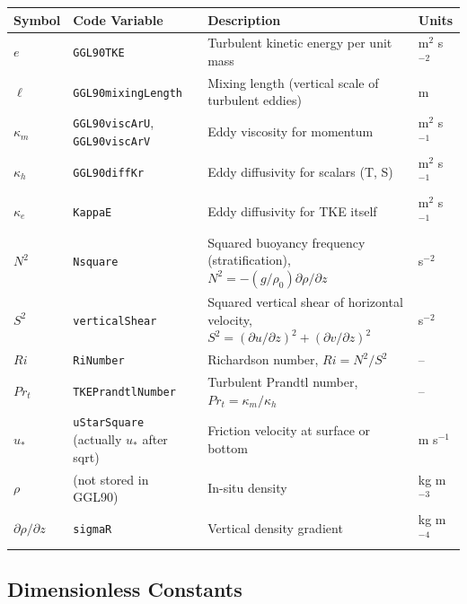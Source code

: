 \documentclass[12pt,letterpaper]{article}
\begin{document}
\begin{longtable}{p{2.5cm}p{4cm}p{6cm}l}
\toprule
\textbf{Symbol} & \textbf{Code Variable} & \textbf{Description} & \textbf{Units} \\
\midrule
\endhead
$e$ & \verb|GGL90TKE| & Turbulent kinetic energy per unit mass & m$^2$ s$^{-2}$ \\
\addlinespace
$\ell$ & \verb|GGL90mixingLength| & Mixing length (vertical scale of turbulent eddies) & m \\
\addlinespace
$\kappa_m$ & \verb|GGL90viscArU|, \verb|GGL90viscArV| & Eddy viscosity for momentum & m$^2$ s$^{-1}$ \\
\addlinespace
$\kappa_h$ & \verb|GGL90diffKr| & Eddy diffusivity for scalars (T, S) & m$^2$ s$^{-1}$ \\
\addlinespace
$\kappa_e$ & \verb|KappaE| & Eddy diffusivity for TKE itself & m$^2$ s$^{-1}$ \\
\addlinespace
$N^2$ & \verb|Nsquare| & Squared buoyancy frequency (stratification), $N^2 = -(g/\rho_0) \partial\rho/\partial z$ & s$^{-2}$ \\
\addlinespace
$S^2$ & \verb|verticalShear| & Squared vertical shear of horizontal velocity, $S^2 = (\partial u/\partial z)^2 + (\partial v/\partial z)^2$ & s$^{-2}$ \\
\addlinespace
$Ri$ & \verb|RiNumber| & Richardson number, $Ri = N^2 / S^2$ & -- \\
\addlinespace
$Pr_t$ & \verb|TKEPrandtlNumber| & Turbulent Prandtl number, $Pr_t = \kappa_m / \kappa_h$ & -- \\
\addlinespace
$u_*$ & \verb|uStarSquare| (actually $u_*$ after sqrt) & Friction velocity at surface or bottom & m s$^{-1}$ \\
\addlinespace
$\rho$ & (not stored in GGL90) & In-situ density & kg m$^{-3}$ \\
\addlinespace
$\partial\rho/\partial z$ & \verb|sigmaR| & Vertical density gradient & kg m$^{-4}$ \\
\bottomrule
\end{longtable}

\subsection*{Dimensionless Constants}
\end{document}
